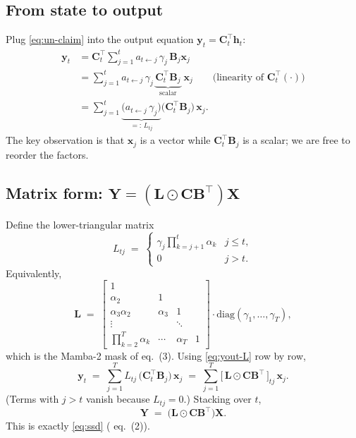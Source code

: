 \documentclass[11pt,a4paper]{article}
\begin{document}
\subsection{From state to output}

Plug \eqref{eq:un-claim} into the output equation
$\bm{y}_t = \bm{C}_t^\top\bm{h}_t$:
\begin{align}
  \bm{y}_t
   &= \bm{C}_t^\top \sum_{j=1}^{t}
        a_{t\leftarrow j}\,\gamma_j\,\bm{B}_j\bm{x}_j \\
   &= \sum_{j=1}^{t}
        a_{t\leftarrow j}\,\gamma_j\,
        \underbrace{\bm{C}_t^\top \bm{B}_j}_{\text{scalar}}\;\bm{x}_j
        \qquad\text{(linearity of $\bm{C}_t^\top(\cdot)$)} \label{eq:yout} \\
   &= \sum_{j=1}^{t}
        \underbrace{\bigl(a_{t\leftarrow j}\,\gamma_j\bigr)}_{=:\,L_{tj}}
        \bigl(\bm{C}_t^\top \bm{B}_j\bigr)\,\bm{x}_j. \label{eq:yout-L}
\end{align}
The key observation is that $\bm{x}_j$ is a vector while
$\bm{C}_t^\top\bm{B}_j$ is a scalar; we are free to reorder the
factors.

\subsection{Matrix form: $\bm{Y} = (\bm{L}\odot \bm{C}\bm{B}^\top)\bm{X}$}

Define the lower-triangular matrix
\begin{equation}\label{eq:L2}
  L_{tj} \;=\;
  \begin{cases}
     \gamma_j\displaystyle\prod_{k=j+1}^{t}\alpha_k & j \le t,\\[4pt]
     0 & j > t.
  \end{cases}
\end{equation}
Equivalently,
\begin{equation}\label{eq:Lmat}
  \bm{L} \;=\;
  \begin{bmatrix}
     1    &      &       &      \\
     \alpha_2 & 1 &       &      \\
     \alpha_3\alpha_2 & \alpha_3 & 1 &   \\
     \vdots & & \ddots & \\
     \prod_{k=2}^{T}\alpha_k & \cdots & \alpha_T & 1
  \end{bmatrix}\cdot\mathrm{diag}(\gamma_1,\dots,\gamma_T),
\end{equation}
which is the Mamba-2 mask of \cite{mamba3} eq.~(3). Using
\eqref{eq:yout-L} row by row,
\begin{equation}\label{eq:rowform}
  \bm{y}_t \;=\; \sum_{j=1}^{T} L_{tj}\,\bigl(\bm{C}_t^\top \bm{B}_j\bigr)\,\bm{x}_j
         \;=\; \sum_{j=1}^{T}
                \bigl[\,\bm{L}\odot\bm{C}\bm{B}^\top\,\bigr]_{tj}\,\bm{x}_j.
\end{equation}
(Terms with $j>t$ vanish because $L_{tj}=0$.) Stacking over $t$,
\begin{equation}\label{eq:ssd-derived}
  \boxed{\;\bm{Y} \;=\; \bigl(\bm{L}\odot \bm{C}\bm{B}^\top\bigr)\bm{X}.\;}
\end{equation}
This is exactly \eqref{eq:ssd} (\cite{mamba3} eq.~(2)).
\end{document}
